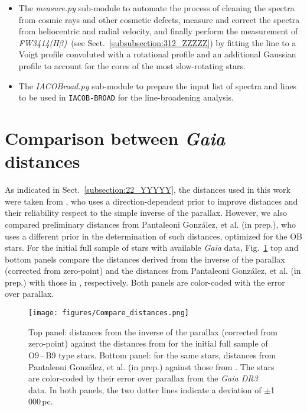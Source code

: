 \documentclass{aa}
\newcommand{\fwhb}{\textit{FW3414(H$\beta$)}}
\begin{document}
\begin{appendix}
\begin{itemize}
    \item The \textit{measure.py} sub-module to automate the process of cleaning the spectra from cosmic rays and other cosmetic defects, measure and correct the spectra from heliocentric and radial velocity, and finally perform the measurement of \fwhb\ (see Sect.~\ref{subsubsection:312_ZZZZZ}) by fitting the line to a Voigt profile convoluted with a rotational profile and an additional Gaussian profile to account for the cores of the most slow-rotating stars. \smallskip
    
    \item The \textit{IACOBroad.py} sub-module to prepare the input list of spectra and lines to be used in {\tt IACOB-BROAD} for the line-broadening analysis. 

\end{itemize}


\section{Comparison between {\em Gaia} distances}
\label{apen.distances}
As indicated in Sect.~\ref{subsection:22_YYYYY}, the distances used in this work were taken from \citep{2021AJ....161..147B}, who uses a direction-dependent prior to improve distances and their reliability respect to the simple inverse of the parallax. However, we also compared preliminary distances from Pantaleoni González, et al. (in prep.), who uses a different prior in the determination of such distances, optimized for the OB stars. For the initial full sample of stars with available {\em Gaia} data, Fig.~\ref{fig:distances} top and bottom panels compare the distances derived from the inverse of the parallax (corrected from zero-point) and the distances from Pantaleoni González, et al. (in prep.) with those in \citep{2021AJ....161..147B}, respectively. Both panels are color-coded with the error over parallax.

\begin{figure}[!t]
\centering
\texttt{[image: figures/Compare\_distances.png]}
\caption{Top panel: distances from the inverse of the parallax (corrected from zero-point) against the distances from \citep{2021AJ....161..147B} for the initial full sample of O9\,--\,B9 type stars. Bottom panel: for the same stars, distances from Pantaleoni González, et al. (in prep.) against those from  \citep{2021AJ....161..147B}. The stars are color-coded by their error over parallax from the {\em Gaia DR3} data. In both panels, the two dotter lines indicate a deviation of $\pm$1\,000\,pc.} 
\label{fig:distances}
\end{figure}


\end{appendix}
\end{document}
